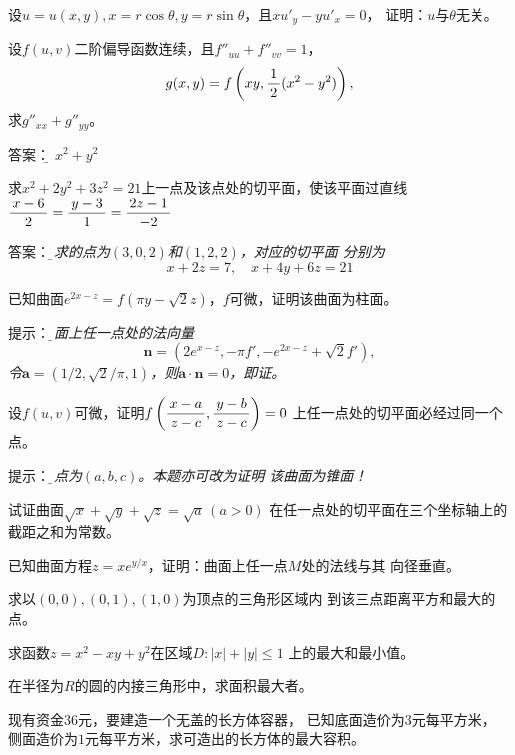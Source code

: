 \begin{frame}
	\linespread{1.2}
	设$u=u(x,y),x=r\cos\theta,y=r\sin\theta$，且$xu'_y-yu'_x=0$，
	证明：$u$与$\theta$无关。
	
	\bigskip\bigskip\pause
	设$f(u,v)$二阶偏导函数连续，且$f''_{uu}+f''_{vv}=1$，
	$$g(x,y)=f\left(xy,\displaystyle\frac{\,{1}\,}{\,{2}\,}(x^2-y^2)\right),$$
	求$g''_{xx}+g''_{yy}$。
	
	\pause\alert{答案：}{\it\b  
	$x^2+y^2$
	}
\end{frame}

\begin{frame}
	\linespread{2}
	求$x^2+2y^2+3z^2=21$上一点及该点处的切平面，使该平面过直线
	$\displaystyle\frac{\,{x-6}\,}{\,{2}\,}=\displaystyle\frac{\,{y-3}\,}{\,{1}\,}=\displaystyle\frac{\,{2z-1}\,}{\,{-2}\,}$
	
	\pause\alert{答案：}{\it\b 所求的点为$(3,0,2)$和$(1,2,2)$，对应的切平面
	分别为
	$$x+2z=7,\quad x+4y+6z=21$$
	}
\end{frame}

\begin{frame}
	\linespread{2}
	已知曲面$e^{2x-z}=f(\pi y-\sqrt2z)$，$f$可微，证明该曲面为柱面。
	
	\pause\alert{提示：}{\it\b 曲面上任一点处的法向量  
	$$\bm{n}=(2e^{x-z},-\pi f',-e^{2x-z}+\sqrt2f'),$$
	令$\bm{a}=(1/2,\sqrt2/\pi,1)$，则$\bm{a}\cdot\bm{n}=0$，即证。
	}
\end{frame}

\begin{frame}
	\linespread{2}
	设$f(u,v)$可微，证明$f\left(\displaystyle\frac{\,{x-a}\,}{\,{z-c}\,},
	\displaystyle\frac{\,{y-b}\,}{\,{z-c}\,}\right)=0$	上任一点处的切平面必经过同一个点。
	
	\pause\alert{提示：}{\it\b 该点为$(a,b,c)$。\pause 本题亦可改为证明
	该曲面为锥面！
	}
	
	\bigskip\pause
	试证曲面$\sqrt{x}+\sqrt y+\sqrt z=\sqrt a\,(a>0)$
	在任一点处的切平面在三个坐标轴上的截距之和为常数。
	
	\bigskip\pause
	已知曲面方程$z=xe^{y/x}$，证明：曲面上任一点$M$处的法线与其
	向径垂直。
\end{frame}

\begin{frame}
	\linespread{1.2}
	求以$(0,0),(0,1),(1,0)$为顶点的三角形区域内
	到该三点距离平方和最大的点。
	\bigskip\pause
	
	求函数$z=x^2-xy+y^2$在区域$D:|x|+|y|\leq 1$
	上的最大和最小值。
	\bigskip\pause
	
	在半径为$R$的圆的内接三角形中，求面积最大者。
	\bigskip\pause
	
	现有资金$36$元，要建造一个无盖的长方体容器，
	已知底面造价为$3$元每平方米，
	侧面造价为$1$元每平方米，求可造出的长方体的最大容积。
\end{frame}

